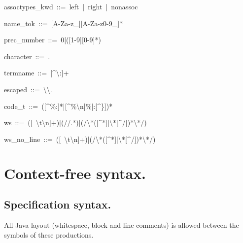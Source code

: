\documentclass[12pt,english,twoside]{report}
\newenvironment{codeblock}
{\begin{list}{}{
\setlength{\rightmargin}{\leftmargin}
\setlength{\listparindent}{0pt}%
\raggedright
\setlength{\itemsep}{0pt}
\setlength{\parsep}{0pt}
\normalfont\ttfamily}%
 \item[]}
{\end{list}}
\begin{document}
\begin{codeblock}
assoctypes\_kwd~::=~left~|~right~|~nonassoc

name\_tok~::=~{[}A-Za-z\_]{[}A-Za-z0-9\_]{*}

prec\_number~::=~0|({[}1-9]{[}0-9]{*})

character~::=~.

termname~::=~{[}\textasciicircum{}\textbackslash{}:]+

escaped~::=~\textbackslash{}\textbackslash{}.

code\_t~::=~({[}\textasciicircum{}\%:]{*}|{[}\textasciicircum{}\%\textbackslash{}n]\%|:{[}\textasciicircum{}\}]){*}

ws~::=~({[}~\textbackslash{}t\textbackslash{}n]+)|(//.{*})|(/\textbackslash{}{*}({[}\textasciicircum{}{*}]|\textbackslash{}{*}{[}\textasciicircum{}/]){*}\textbackslash{}{*}/)

ws\_no\_line~::=~({[}~\textbackslash{}t\textbackslash{}n]+)|(/\textbackslash{}{*}({[}\textasciicircum{}{*}]|\textbackslash{}{*}{[}\textasciicircum{}/]){*}\textbackslash{}{*}/)
\end{codeblock}

\section{Context-free syntax.}


\subsection{Specification syntax.}

All Java layout (whitespace, block and line comments) is allowed between
the symbols of these productions.
\end{document}
